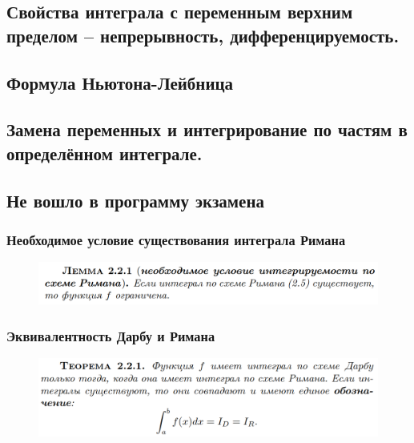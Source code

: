 \documentclass{article}
\begin{document}
\newpage
\subsection{Свойства интеграла с переменным верхним пределом -- непрерывность, дифференцируемость.}

\newpage
\subsection{Формула Ньютона-Лейбница}

\newpage
\subsection{Замена переменных и интегрирование по частям в определённом интеграле.}

\newpage
\subsection{Не вошло в программу экзамена}
\subsubsection{Необходимое условие существования интеграла Римана}
\vspace{-0.5cm}
\begin{figure}[h!]
    \centering
    \includegraphics[width=\textwidth]{63.png}
    \vspace{-1cm}
\end{figure}
\subsubsection{Эквивалентность Дарбу и Римана}
\begin{figure}[h!]
    \centering
    \includegraphics[width=\textwidth]{64.png}
    \vspace{-1cm}
\end{figure}
\end{document}
